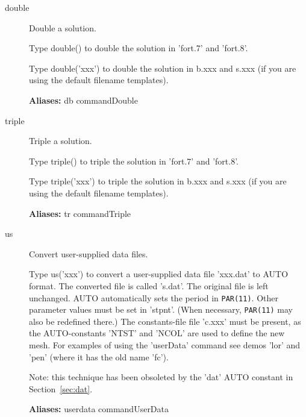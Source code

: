 \documentclass[12pt]{report}
\begin{document}
\begin{description}
\item[double]
Double a solution.

    Type double() to double the solution in 'fort.7' and 'fort.8'.

    Type double('xxx') to double the solution in b.xxx and s.xxx (if you
    are using the default filename templates).
    
\textbf{Aliases:} db commandDouble

\item[triple]
Triple a solution.

    Type triple() to triple the solution in 'fort.7' and 'fort.8'.

    Type triple('xxx') to triple the solution in b.xxx and s.xxx (if you
    are using the default filename templates).
    
\textbf{Aliases:} tr commandTriple

\item[us]
Convert user-supplied data files.

    Type us('xxx') to convert a user-supplied data file 'xxx.dat' to
    AUTO format. The converted file is called 's.dat'.  The original
    file is left unchanged.  AUTO automatically sets the period in
    {\tt PAR(11)}.  Other parameter values must be set in 'stpnt'. (When
    necessary, {\tt PAR(11)} may also be redefined there.)  The
    constants-file file 'c.xxx' must be present, as the AUTO-constants
    'NTST' and 'NCOL' are used to define the new mesh.  For examples
    of using the 'userData' command see demos 'lor' and 'pen' (where
    it has the old name 'fc').

    Note: this technique has been obsoleted by the 'dat' AUTO constant
    in Section~\ref{sec:dat}.
    
\textbf{Aliases:} userdata commandUserData
\end{description}
\end{document}
